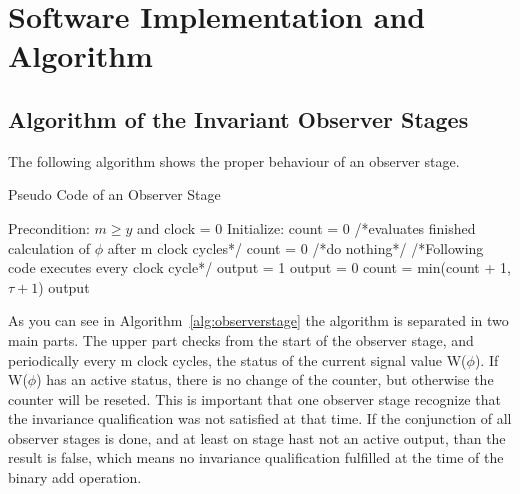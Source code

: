 
\chapter{Software Implementation and Algorithm}



\section{Algorithm of the Invariant Observer Stages}

The following algorithm shows the proper behaviour of an observer stage.\newline

\begin{algorithm}
\caption{Pseudo Code of an Observer Stage}
\label{alg:observerstage}
\begin{algorithmic}[1]
\REQUIRE Precondition: $m \ge y$ and clock = 0
\STATE Initialize: count = 0
 \STATE  /*evaluates finished calculation of $\phi$ after m clock cycles*/
 \STATE  count = 0 
 \ELSE
  \STATE /*do nothing*/ 
 \ENDIF
\ENDIF 
\STATE /*Following code executes every clock cycle*/
 \STATE output = 1
\ELSE
 \STATE output = 0
\ENDIF
\STATE count = min(count + 1,$\tau + 1$)
\RETURN output
\end{algorithmic}
\end{algorithm}

As you can see in  Algorithm~\ref{alg:observerstage} the algorithm is separated in two main parts. 
The upper part checks from the start of the observer stage, and periodically every m clock cycles,
the status of the current signal value W($\phi$). If W($\phi$) has an active status, there is no change of
the counter, but otherwise the counter will be reseted.
This is important that one observer stage recognize that the invariance qualification was not satisfied
at that time. If the conjunction of all observer stages is done, and at least on stage hast not an active output,
than the result is false, which means no invariance qualification fulfilled at the time of the binary add operation. \newline

